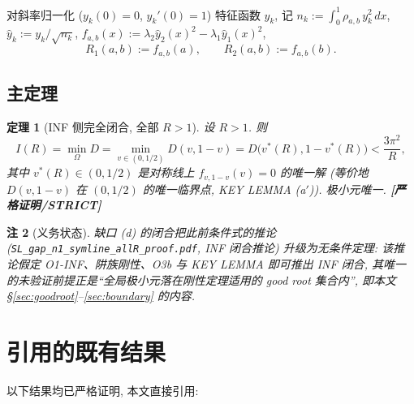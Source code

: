 \documentclass[UTF8]{ctexart}
\newtheorem{theorem}{定理}[section]
\newtheorem{remark}[theorem]{注}
\newcommand{\STRICT}{\textbf{[严格证明/STRICT]}}
\begin{document}
对斜率归一化 ($y_k(0)=0$, $y_k'(0)=1$) 特征函数 $y_k$, 记
$n_k:=\int_0^1\rho_{a,b}\,y_k^2\,dx$, $\hat y_k:=y_k/\sqrt{n_k}$,
$f_{a,b}(x):=\lambda_2\hat y_2(x)^2-\lambda_1\hat y_1(x)^2$,
\begin{equation}
	R_1(a,b):=f_{a,b}(a),\qquad R_2(a,b):=f_{a,b}(b).
	\label{eq:resid}
\end{equation}

\subsection{主定理}

\begin{theorem}[INF 侧完全闭合, 全部 $R>1$]\label{thm:main}
设 $R>1$. 则
\begin{equation}
	I(R)=\min_{\Omega}D=\min_{v\in(0,1/2)}D(v,1-v)=D\bigl(v^*(R),1-v^*(R)\bigr)
	<\frac{3\pi^2}{R},
	\label{eq:main}
\end{equation}
其中 $v^*(R)\in(0,1/2)$ 是对称线上 $f_{v,1-v}(v)=0$ 的唯一解
(等价地 $D(v,1-v)$ 在 $(0,1/2)$ 的唯一临界点, KEY LEMMA (a$'$)).
极小元唯一. \STRICT{}
\end{theorem}

\begin{remark}[义务状态]
缺口 (d) 的闭合把此前条件式的推论
(\texttt{SL\_gap\_n1\_symline\_allR\_proof.pdf}, INF 闭合推论)
升级为无条件定理: 该推论假定 O1-INF、阱族刚性、O3b 与 KEY LEMMA 即可推出
INF 闭合, 其唯一的未验证前提正是``全局极小元落在刚性定理适用的 good root
集合内'', 即本文 \S\ref{sec:goodroot}--\ref{sec:boundary} 的内容.
\end{remark}

\section{引用的既有结果}\label{sec:citations}

以下结果均已严格证明, 本文直接引用:
\end{document}
